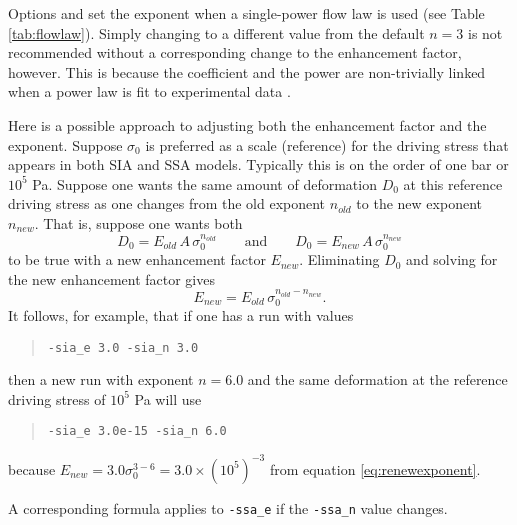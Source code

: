 Options  and  set the exponent when a single-power flow law is used (see Table \ref{tab:flowlaw}).  Simply changing to a different value from the default $n=3$ is not recommended without a corresponding change to the enhancement factor, however.  This is because the coefficient and the power are non-trivially linked when a power law is fit to experimental data \cite{CuffeyPaterson,PatersonBudd}.

Here is a possible approach to adjusting both the enhancement factor and the exponent.  Suppose $\sigma_0$ is preferred as a scale (reference) for the driving stress that appears in both SIA and SSA models.  Typically this is on the order of one bar or $10^5$ Pa.  Suppose one wants the same amount of deformation $D_0$ at this reference driving stress as one changes from the old exponent $n_{old}$ to the new exponent $n_{new}$.  That is, suppose one wants both
  $$D_0 = E_{old}\, A\, \sigma_0^{n_{old}} \qquad \text{and} \qquad D_0 = E_{new}\, A\, \sigma_0^{n_{new}}$$
to be true with a new enhancement factor $E_{new}$.  Eliminating $D_0$ and solving for the new enhancement factor gives
\begin{equation}
E_{new} = E_{old}\, \sigma_0^{n_{old} - n_{new}}.  \label{eq:renewexponent}
\end{equation}
It follows, for example, that if one has a run with values
\begin{quote}
\texttt{-sia_e 3.0 -sia_n 3.0}
\end{quote}
then a new run with exponent $n=6.0$ and the same deformation at the reference driving stress of $10^5$ Pa will use
\begin{quote}
\texttt{-sia_e 3.0e-15 -sia_n 6.0}
\end{quote}
because $E_{new} = 3.0 \sigma_0^{3-6} = 3.0 \times (10^5)^{-3}$ from equation \eqref{eq:renewexponent}.

A corresponding formula applies to \texttt{-ssa_e} if the \texttt{-ssa_n} value changes.


